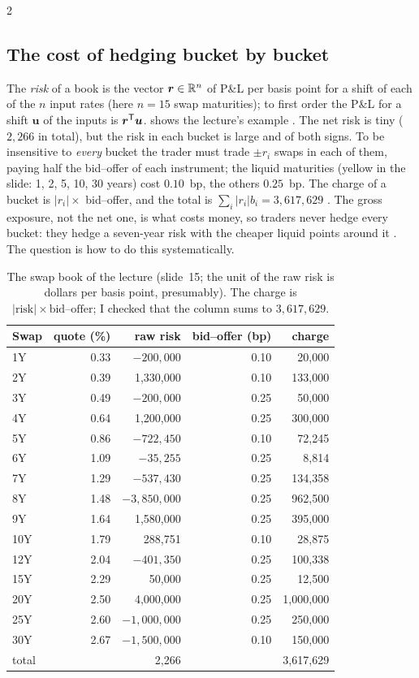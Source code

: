 \begin{paracol}{2}
\subsection{The cost of hedging bucket by bucket}\label{ch20:sec-cost}
The \emph{risk} of a book is the vector $\bm r\in\mathbb{R}^n$ of P\&L per basis point for a shift of each of the $n$ input rates (here $n=15$ swap maturities);
to first order the P\&L for a shift $\bm u$ of the inputs is $\bm r^{\mathsf T}\bm u$.  shows the lecture's example . The
net risk is tiny ($2{,}266$ in total), but the risk in each bucket is large and of both signs. To be insensitive to \emph{every} bucket the trader must trade
$\pm r_i$ swaps in each of them, paying half the bid--offer of each instrument; the liquid maturities (yellow in the slide: 1, 2, 5, 10, 30 years) cost $0.10$~bp, the
others $0.25$~bp. The charge of a bucket is $|r_i|\times$ bid--offer, and the total is $\sum_i|r_i|b_i=3{,}617{,}629$
. The gross exposure, not the net one, is what costs money, so traders never hedge every bucket: they hedge a seven-year risk
with the cheaper liquid points around it . The question is how to do this systematically.

\begin{table}[ht]
\centering\small
\begin{tabular}{lrrrr}
\toprule
Swap & quote (\%) & raw risk & bid--offer (bp) & charge\\
\midrule
1Y & 0.33 & $-200{,}000$ & 0.10 & 20,000\\
2Y & 0.39 & 1,330,000 & 0.10 & 133,000\\
3Y & 0.49 & $-200{,}000$ & 0.25 & 50,000\\
4Y & 0.64 & 1,200,000 & 0.25 & 300,000\\
5Y & 0.86 & $-722{,}450$ & 0.10 & 72,245\\
6Y & 1.09 & $-35{,}255$ & 0.25 & 8,814\\
7Y & 1.29 & $-537{,}430$ & 0.25 & 134,358\\
8Y & 1.48 & $-3{,}850{,}000$ & 0.25 & 962,500\\
9Y & 1.64 & 1,580,000 & 0.25 & 395,000\\
10Y & 1.79 & 288,751 & 0.10 & 28,875\\
12Y & 2.04 & $-401{,}350$ & 0.25 & 100,338\\
15Y & 2.29 & 50,000 & 0.25 & 12,500\\
20Y & 2.50 & 4,000,000 & 0.25 & 1,000,000\\
25Y & 2.60 & $-1{,}000{,}000$ & 0.25 & 250,000\\
30Y & 2.67 & $-1{,}500{,}000$ & 0.10 & 150,000\\
\midrule
total & & 2,266 & & 3,617,629\\
\bottomrule
\end{tabular}
\caption{The swap book of the lecture (slide~15; the unit of the raw risk is dollars per basis point, presumably). The charge is $|\text{risk}|\times\text{bid--offer}$;
I checked that the column sums to $3{,}617{,}629$.}\label{ch20:tab-risk}
\end{table}


\end{paracol}
